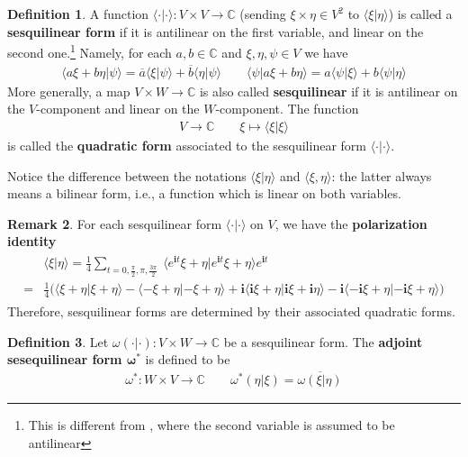 \documentclass[12pt,b5paper,notitlepage]{article}
\theoremstyle{definition}
\newtheorem{df}{Definition}[subsection]
\newtheorem{rem}[df]{Remark}
\theoremstyle{plain}
\newcommand{\ovl}{\overline}
\newcommand{\bk}[1]{\langle {#1}\rangle}
\newcommand{\im}{\mathbf{i}}
\newcommand{\Cbb}{\mathbb C}
\numberwithin{equation}{section}
\begin{document}
\begin{df}
A function $\bk{\cdot|\cdot}:V\times V\rightarrow\Cbb$ (sending $\xi\times \eta\in V^2$ to $\bk{\xi|\eta}$) is called a \textbf{sesquilinear form}  if it is antilinear on the first variable, and linear on the second one.\footnote{This is different from \cite{Gui-A}, where the second variable is assumed to be antilinear} Namely, for each $a,b\in\Cbb$ and $\xi,\eta,\psi\in V$ we have
\begin{gather*}
\bk{a\xi+b\eta|\psi}=\ovl a\bk{\xi|\psi}+\ovl b\bk{\eta|\psi}\qquad \bk{\psi|a\xi+b\eta}=a\bk{\psi|\xi}+b\bk{\psi|\eta}
\end{gather*}
More generally, a map $V\times W\rightarrow\Cbb$ is also called \textbf{sesquilinear} if it is antilinear on the $V$-component and linear on the $W$-component. The function
\begin{align*}
V\rightarrow\Cbb\qquad \xi\mapsto\bk{\xi|\xi}
\end{align*}
is called the \textbf{quadratic form}  associated to the sesquilinear form $\bk{\cdot|\cdot}$.
\end{df}

Notice the difference between the notations $\bk{\xi|\eta}$ and $\bk{\xi,\eta}$: the latter always means a bilinear form, i.e., a function which is linear on both variables.


\begin{rem}\label{lb237}
For each sesquilinear form $\bk{\cdot|\cdot}$ on $V$, we have the \textbf{polarization identity} 
\begin{align}\label{eq134}
\begin{aligned}
&\bk{\xi|\eta}=\frac 14\sum_{t=0,\frac \pi 2,\pi,\frac{3\pi}2}~ \bk{e^{\im t}\xi+\eta|e^{\im t}\xi+\eta}e^{\im t}\\
=&\frac 14\Big(\bk{\xi+\eta|\xi+\eta}-\bk{-\xi+\eta|-\xi+\eta}+\im\bk{\im \xi+\eta|\im \xi+\im \eta}-\im\bk{-\im \xi+\eta|-\im \xi+\eta}\Big)
\end{aligned}
\end{align}
Therefore, sesquilinear forms are determined by their associated quadratic forms.
\end{rem}



\begin{df}
Let $\omega(\cdot|\cdot):V\times W\rightarrow\Cbb$ be a sesquilinear form. The \textbf{adjoint sesequilinear form $\pmb{\omega^*}$}   is defined to be
\begin{align*}
\omega^*:W\times V\rightarrow\Cbb\qquad \omega^*(\eta|\xi)=\ovl{\omega(\xi|\eta)}
\end{align*}
\end{df}
\end{document}
